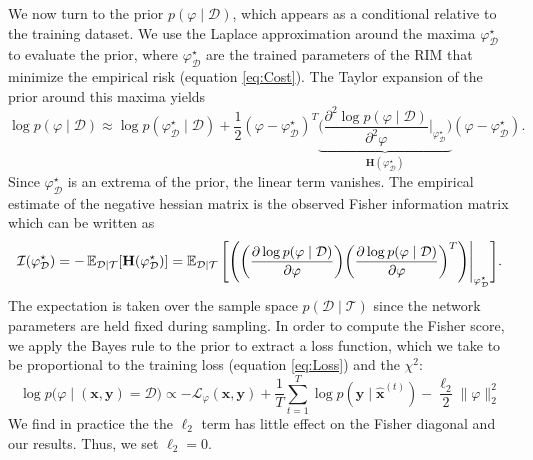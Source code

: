 We now turn to the prior $p(\varphi \mid \mathcal{D})$, which 
appears as a conditional relative to 
the training dataset. 
We use the Laplace approximation around the maxima $\varphi^{\star}_{\mathcal{D}}$ 
to evaluate the prior,
where $\varphi^{\star}_{\mathcal{D}}$ 
are the trained parameters of the RIM that minimize the empirical risk (equation \eqref{eq:Cost}). 
The Taylor expansion of the prior around this maxima yields
\begin{equation}\label{app:prior}
        \log p(\varphi \mid \mathcal{D}) \approx \log p(\varphi^{\star}_{\mathcal{D}} \mid \mathcal{D}) 
        + \frac{1}{2} (\varphi - \varphi^{\star}_{\mathcal{D}})^{T} 
        \underbrace{
        \bigg(
                \frac{\partial^2 \log p(\varphi \mid \mathcal{D})}{\partial^2 \varphi}\bigg|_{\varphi^{\star}_{\mathcal{D}}}
        \bigg)
}_{\displaystyle \mathbf{H}(\varphi^{\star}_{\mathcal{D}})}
        (\varphi - \varphi^{\star}_{\mathcal{D}}).
\end{equation} 
Since $\varphi^{\star}_{\mathcal{D}}$ is an extrema of the prior, the linear term vanishes. 
The empirical estimate of the negative hessian matrix is the observed Fisher information 
matrix which can be written as
\begin{equation}\label{app:fisher}
        \mathcal{I}(\varphi^{\star}_{\mathcal{D}}) = 
        -\operatorname{\mathbb{E}}_{\mathcal{D} \mid \mathcal{T}} [\mathbf{H}(\varphi^{\star}_{\mathcal{D}})] = 
        \operatorname{\mathbb{E}}_{\mathcal{D}\mid \mathcal{T}}
        \Bigg[
                \Bigg(
                \bigg( 
                        \frac{\partial \log p(\varphi \mid \mathcal{D})}{\partial \varphi}
                \bigg) 
                \bigg( 
                        \frac{\partial \log p(\varphi \mid \mathcal{D})}{\partial \varphi}
                \bigg)^{T}
        \Bigg)
\Bigg|_{\varphi^{\star}_{\mathcal{D}}}\Bigg].
\end{equation} 
The expectation is taken over the sample space $p(\mathcal{D} \mid \mathcal{T})$ since 
the network parameters are held fixed during sampling.
In order to compute the Fisher score, 
we apply the Bayes rule to the prior to extract a loss function,
which we take to be 
proportional to the training loss (equation \eqref{eq:Loss}) and the $\chi^2$:
\begin{equation}\label{eq:LossFisher}
        \log p\big(\varphi \mid (\mathbf{x}, \mathbf{y}) = \mathcal{D}\big) \propto -\mathcal{L}_{\varphi}(\mathbf{x}, \mathbf{y}) + \frac{1}{T}\sum_{t=1}^{T}\log p(\mathbf{y} \mid \mathbf{\hat{x}}^{(t)}) - \frac{\ell_2}{2}\lVert \varphi \rVert^2_2
\end{equation} 
We find in practice the the $\ell_2$ term has little effect on the 
Fisher diagonal and our results. Thus, we set $\ell_2 = 0$.

